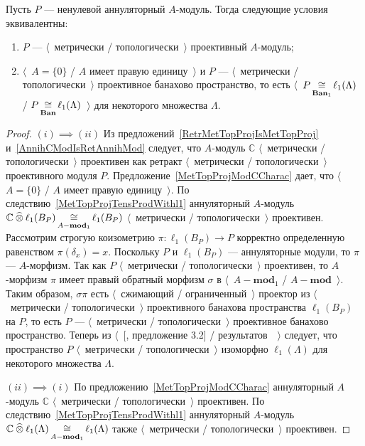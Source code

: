 \begin{proposition}\label{MetTopProjOfAnnihModCharac} Пусть $P$ --- ненулевой
аннуляторный $A$-модуль. Тогда следующие условия эквивалентны:
\begin{enumerate}[label = (\roman*)]
    \item $P$ --- $\langle$~метрически / топологически~$\rangle$ проективный
    $A$-модуль;

    \item $\langle$~$A= \{0 \}$ / $A$ имеет правую единицу~$\rangle$ и $P$ ---
    $\langle$~метрически / топологически~$\rangle$ проективное банахово
    пространство, то есть $\langle$~$P\mathop{\mathbin{\cong}}\limits_{\mathbf{Ban}_1}\ell_1(\Lambda)$ /
    $P\mathop{\mathbin{\cong}}\limits_{\mathbf{Ban}}\ell_1(\Lambda)$~$\rangle$ для некоторого множества
    $\Lambda$.
\end{enumerate}
\end{proposition}
\begin{proof} $(i) \implies (ii)$ Из
предложений~\ref{RetrMetTopProjIsMetTopProj} и~\ref{AnnihCModIsRetAnnihMod}
следует, что $A$-модуль $\mathbb{C}$ $\langle$~метрически /
топологически~$\rangle$ проективен как ретракт $\langle$~метрически /
топологически~$\rangle$ проективного модуля $P$.
Предложение~\ref{MetTopProjModCCharac} дает, что $\langle$~$A= \{0 \}$ / $A$
имеет правую единицу~$\rangle$.  По следствию~\ref{MetTopProjTensProdWithl1}
аннуляторный $A$-модуль
$\mathbb{C}\mathbin{\widehat{\otimes}}\ell_1(B_P)\mathop{\mathbin{\cong}}\limits_{A-\mathbf{mod}_1}\ell_1(B_P)$
$\langle$~метрически / топологически~$\rangle$ проективен. Рассмотрим строгую
коизометрию $\pi:\ell_1(B_P)\to P$ корректно определенную равенством
$\pi(\delta_x)=x$. Поскольку $P$ и $\ell_1(B_P)$ --- аннуляторные модули, то
$\pi$ --- $A$-морфизм. Так как $P$ $\langle$~метрически /
топологически~$\rangle$ проективен, то $A$-морфизм $\pi$ имеет правый обратный
морфизм $\sigma$ в $\langle$~$A-\mathbf{mod}_1$ / $A-\mathbf{mod}$~$\rangle$.
Таким образом, $\sigma\pi$ есть $\langle$~сжимающий / ограниченный~$\rangle$
проектор из $\langle$~метрически / топологически~$\rangle$ проективного банахова
пространства $\ell_1(B_P)$ на $P$, то есть $P$ --- $\langle$~метрически /
топологически~$\rangle$ проективное банахово пространство. Теперь из
$\langle$~[\cite{HelMetrFrQMod}, предложение 3.2] /
результатов~\cite{KotheTopProjBanSp}~$\rangle$ следует, что пространство $P$
$\langle$~метрически / топологически~$\rangle$ изоморфно $\ell_1(\Lambda)$ для
некоторого множества $\Lambda$. 

$(ii) \implies (i)$ По предложению~\ref{MetTopProjModCCharac} аннуляторный
$A$-модуль $\mathbb{C}$ $\langle$~метрически / топологически~$\rangle$
проективен. По следствию~\ref{MetTopProjTensProdWithl1} аннуляторный $A$-модуль
$\mathbb{C}\mathbin{\widehat{\otimes}}\ell_1(\Lambda)\mathop{\mathbin{\cong}}\limits_{A-\mathbf{mod}_1}\ell_1(\Lambda)$ также
$\langle$~метрически / топологически~$\rangle$ проективен.
\end{proof}

